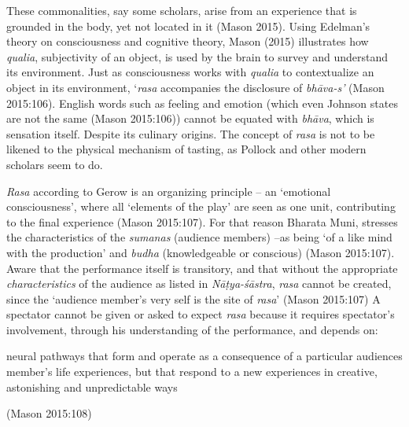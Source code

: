 These commonalities, say some scholars, arise from an experience that is grounded in the body, yet not located in it (Mason 2015). Using Edelman’s theory on consciousness and cognitive theory, Mason (2015) illustrates how \textsl{qualia}, subjectivity of an object, is used by the brain to survey and understand its environment. Just as consciousness works with \textsl{qualia} to contextualize an object in its environment, ‘\textsl{rasa} accompanies the disclosure of \textsl{bhāva-s’} (Mason 2015:106). English words such as feeling and emotion (which even Johnson states are not the same (Mason 2015:106)) cannot be equated with \textsl{bhāva}, which is sensation itself. Despite its culinary origins. The concept of \textsl{rasa} is not to be likened to the physical mechanism of tasting, as Pollock and other modern scholars seem to do.

\textsl{Rasa} according to Gerow is an organizing principle -- an ‘emotional consciousness’, where all ‘elements of the play’ are seen as one unit, contributing to the final experience (Mason 2015:107). For that reason Bharata Muni, stresses the characteristics of the \textsl{sumanas} (audience members) –as being ‘of a like mind with the production’ and \textsl{budha} (knowledgeable or conscious) (Mason 2015:107). Aware that the performance itself is transitory, and that without the appropriate \textsl{characteristics} of the audience as listed in \textsl{Nāṭya-śāstra}, \textsl{rasa} cannot be created, since the ‘audience member’s very self is the site of \textsl{rasa}’ (Mason 2015:107) A spectator cannot be given or asked to expect \textsl{rasa} because it requires spectator’s involvement, through his understanding of the performance, and depends on:

\begin{myquote}
neural pathways that form and operate as a consequence of a particular audiences member’s life experiences, but that respond to a new experiences in creative, astonishing and unpredictable ways 

\hfill (Mason 2015:108) 
\end{myquote}

